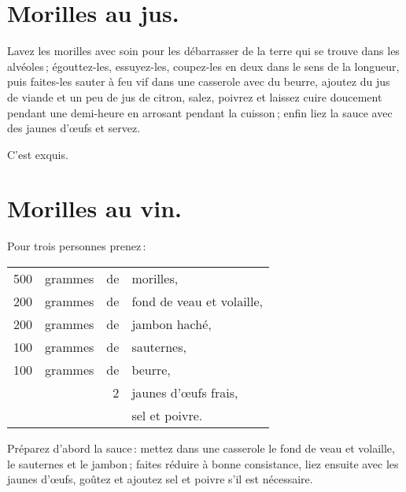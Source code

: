 \section*{\centering Morilles au jus.}
{}

Lavez les morilles avec soin pour les débarrasser de la terre qui se trouve
dans les alvéoles ; égouttez-les, essuyez-les, coupez-les en deux dans le sens
de la longueur, puis faites-les sauter à feu vif dans une casserole avec du
beurre, ajoutez du jus de viande et un peu de jus de citron, salez, poivrez et
laissez cuire doucement pendant une demi-heure en arrosant pendant la cuisson ;
enfin liez la sauce avec des jaunes d'œufs et servez.

C'est exquis.

\section*{\centering Morilles au vin.}
{}

Pour trois personnes prenez :

\footnotesize
\begin{longtable}{rrrp{16em}}
    500 & grammes & de & morilles,                                                                        \\
    200 & grammes & de & fond de veau et volaille,                                                        \\
    200 & grammes & de & jambon haché,                                                                    \\
    100 & grammes & de & sauternes,                                                                       \\
    100 & grammes & de & beurre,                                                                          \\
        &         &  2 & jaunes d'œufs frais,                                                             \\
        &         &    & sel et poivre.                                                                   \\
\end{longtable}
\normalsize

Préparez d’abord la sauce : mettez dans une casserole le fond de veau et
volaille, le sauternes et le jambon ; faites réduire à bonne consistance, liez ensuite
avec les jaunes d'œufs, goûtez et ajoutez sel et poivre s'il est nécessaire.

